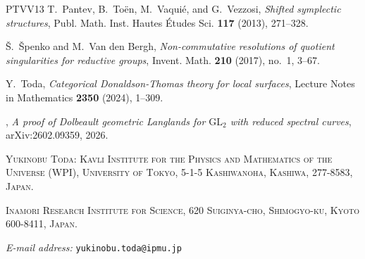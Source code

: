 \documentclass[11pt,oneside,a4paper,mathscr]{amsart}
\theoremstyle{definition}
\begin{document}
\begin{thebibliography}{PTVV13}
T.~Pantev, B.~To{\"e}n, M.~Vaqui{\'e}, and G.~Vezzosi, \emph{Shifted symplectic structures}, Publ. Math. Inst. Hautes {\'E}tudes Sci. \textbf{117} (2013), 271--328.

{\v S}.~{\v S}penko and M.~Van den Bergh, \emph{Non-commutative resolutions of quotient singularities for reductive groups}, Invent. Math. \textbf{210} (2017), no.~1, 3--67.

Y.~Toda, \emph{Categorical {D}onaldson-{T}homas theory for local surfaces}, Lecture Notes in Mathematics \textbf{2350} (2024), 1--309.

\bysame, \emph{A proof of {D}olbeault geometric {L}anglands for {$\mathrm{GL}_2$} with reduced spectral curves}, arXiv:2602.09359, 2026.

\end{thebibliography}

%
%

\vspace{5mm}

{\small\textsc{Yukinobu Toda: Kavli Institute for the Physics and Mathematics of the Universe (WPI), University of Tokyo, 5-1-5 Kashiwanoha, Kashiwa, 277-8583, Japan.}\par}
{\small\textsc{Inamori Research Institute for Science, 620 Suiginya-cho, Shimogyo-ku, Kyoto 600-8411, Japan.}\par}
{\small\textit{E-mail address:} \texttt{yukinobu.toda@ipmu.jp}\par}
\end{document}
